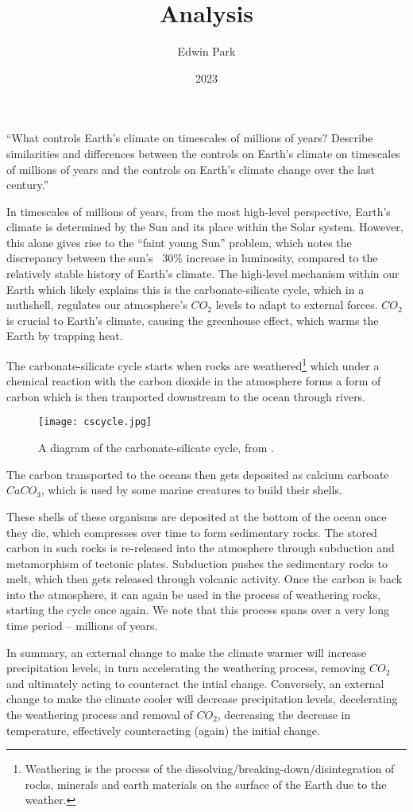 \documentclass{article}
\title{Analysis}
\author{Edwin Park}
\date{2023}
\theoremstyle{definition}
\begin{document}
``What controls Earth's climate on timescales of millions of years? Describe similarities and differences between the controls on Earth's climate on timescales of millions of years and the controls on Earth's climate change over the last century.''

In timescales of millions of years, from the most high-level perspective, Earth's climate is determined by the Sun and its place within the Solar system. However, this alone gives rise to the ``faint young Sun'' problem, which notes the discrepancy between the sun's ~30\% increase in luminosity\cite{gough}, compared to the relatively stable history of Earth's climate. The high-level mechanism within our Earth which likely explains this is the carbonate-silicate cycle, which in a nuthshell, regulates our atmosphere's $CO_2$ levels to adapt to external forces. $CO_2$ is crucial to Earth's climate, causing the greenhouse effect, which warms the Earth by trapping heat.\par

The carbonate-silicate cycle starts when rocks are weathered\footnote{Weathering is the process of the dissolving/breaking-down/disintegration of rocks, minerals and earth materials on the surface of the Earth due to the weather\cite{weatheringdict}.} which under a chemical reaction with the carbon dioxide in the atmosphere forms a form of carbon which is then tranported downstream to the ocean through rivers.
\begin{figure}[h]
	\centering
	\texttt{[image: cscycle.jpg]}
	\caption{A diagram of the carbonate-silicate cycle, from \cite{csc}.}
\end{figure}
The carbon transported to the oceans then gets deposited as calcium carboate $CaCO_3$, which is used by some marine creatures to build their shells.

These shells of these organisms are deposited at the bottom of the ocean once they die, which compresses over time to form sedimentary rocks. The stored carbon in such rocks is re-released into the atmosphere through subduction and metamorphism of tectonic plates\cite{ash}. Subduction pushes the sedimentary rocks to melt, which then gets released through volcanic activity. Once the carbon is back into the atmosphere, it can again be used in the process of weathering rocks, starting the cycle once again. We note that this process spans over a very long time period -- millions of years.\par

In summary, an external change to make the climate warmer will increase precipitation levels, in turn accelerating the weathering process, removing $CO_2$ and ultimately acting to counteract the intial change. Conversely, an external change to make the climate cooler will decrease precipitation levels, decelerating the weathering process and removal of $CO_2$, decreasing the decrease in temperature, effectively counteracting (again) the initial change.
\end{document}
